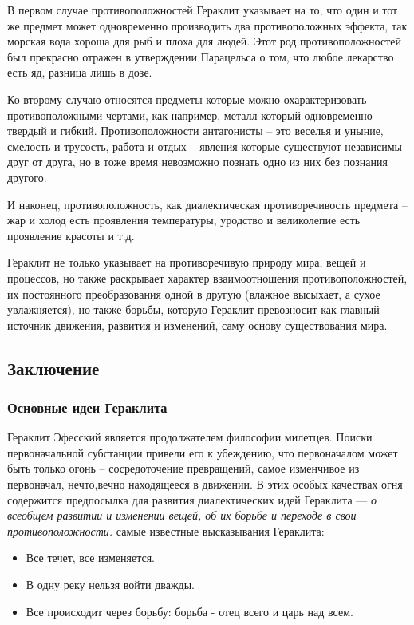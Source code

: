 \documentclass[a4paper, 14pt]{extreport}
\begin{document}
В первом случае противоположностей Гераклит указывает на то, что один и
тот же предмет может одновременно производить два противоположных
эффекта, так морская вода хороша для рыб и плоха для людей. Этот род
противоположностей был прекрасно отражен в утверждении Парацельса о том,
что любое лекарство есть яд, разница лишь в дозе.

Ко второму случаю относятся предметы которые можно охарактеризовать
противоположными чертами, как например, металл который одновременно
твердый и гибкий. Противоположности антагонисты -- это веселья и уныние,
смелость и трусость, работа и отдых -- явления которые существуют
независимы друг от друга, но в тоже время невозможно познать одно из них
без познания другого.

И наконец, противоположность, как диалектическая противоречивость
предмета -- жар и холод есть проявления температуры, уродство и
великолепие есть проявление красоты и т.д.

Гераклит не только указывает на противоречивую природу мира, вещей и
процессов, но также раскрывает характер взаимоотношения
противоположностей, их постоянного преобразования одной в другую
(влажное высыхает, а сухое увлажняется), но также борьбы, которую
Гераклит превозносит как главный источник движения, развития и
изменений, саму основу существования мира.

\subsection{Заключение}

\subsubsection{Основные идеи Гераклита}

Гераклит Эфесский является продолжателем философии милетцев. Поиски
первоначальной субстанции привели его к убеждению, что первоначалом
может быть только огонь -- сосредоточение превращений, самое изменчивое
из первоначал, нечто,вечно находящееся в движении. В этих особых
качествах огня содержится предпосылка для развития диалектических идей
Гераклита --- \emph{о всеобщем развитии и изменении вещей, об их борьбе
и переходе в свои противоположности.} самые известные высказывания
Гераклита:

\begin{itemize}

\item
  Все течет, все изменяется.
\item
  В одну реку нельзя войти дважды.
\item
  Все происходит через борьбу: борьба - отец всего и царь над всем.
\end{itemize}
\end{document}
